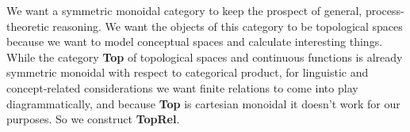 \begin{fullwidth}
 We want a symmetric monoidal category to keep the prospect of general, process-theoretic reasoning. We want the objects of this category to be topological spaces because we want to model conceptual spaces and calculate interesting things. While the category \textbf{Top} of topological spaces and continuous functions is already symmetric monoidal with respect to categorical product, for linguistic and concept-related considerations we want finite relations to come into play diagrammatically, and because \textbf{Top} is cartesian monoidal it doesn't work for our purposes. So we construct \textbf{TopRel}.
\end{fullwidth}
